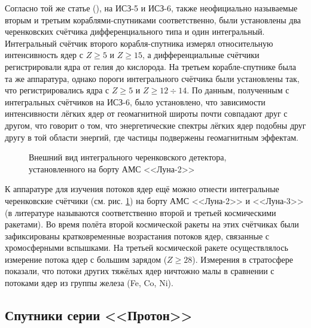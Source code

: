 \documentclass[12pt,a4paper]{report} %
\begin{document}
Согласно той же статье (\cite{Ginzburg}), на ИСЗ-5 и ИСЗ-6, также неофициально называемые вторым и третьим кораблями-спутниками соответственно, были установлены два черенковских счётчика дифференциального типа и один интегральный. Интегральный счётчик второго корабля-спутника измерял относительную интенсивность ядер с $Z\geq5$ и $Z\geq15$, а дифференциальные счётчики регистрировали ядра от гелия до кислорода. 
На третьем корабле-спутнике была та же аппаратура, однако пороги интегрального счётчика были установлены так, что регистрировались ядра с $Z\geq5$ и $Z\geq12\div14$.
По данным, полученным с интегральных счётчиков на ИСЗ-6, было установлено, что зависимости интенсивности лёгких ядер от геомагнитной широты почти совпадают друг с другом, что говорит о том, что энергетические спектры лёгких ядер подобны друг другу в той области энергий, где частицы подвержены геомагнитным эффектам. 
\begin{figure}[th]
	\noindent{}
	\caption{Внешний вид интегрального черенковского детектора, установленного на борту АМС <<Луна-2>>}
	\label{picLunik}
\end{figure}
К аппаратуре для изучения потоков ядер ещё можно отнести интегральные черенковские счётчики (см. рис. \ref{picLunik}) на борту АМС <<Луна-2>> и <<Луна-3>> (в литературе называются соответственно второй и третьей космическими ракетами). Во время полёта второй космической ракеты на этих счётчиках были зафиксированы кратковременные возрастания потоков ядер, связанные с хромосферными вспышками. 
На третьей космической ракете осуществлялось измерение потока ядер с большим зарядом ($Z\geq28$). 
Измерения в стратосфере показали, что потоки других тяжёлых ядер ничтожно малы в сравнении с потоками ядер из группы железа (Fe, Co, Ni).
\subsection{Спутники серии <<Протон>>}
\end{document}
